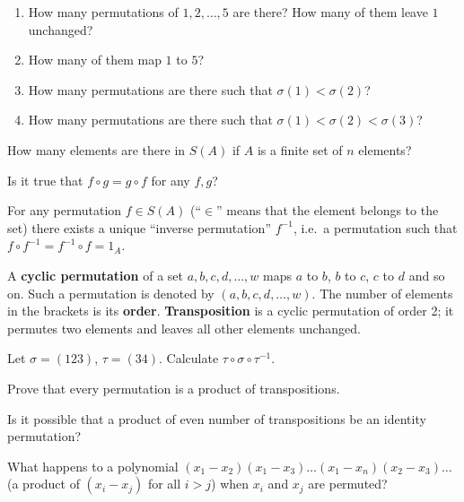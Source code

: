 \documentclass[12pt]{article}
\begin{document}
\begin{zadacha}
\begin{enumerate}
\item How many permutations of $1,2,\dots,5$ are there? How many of
  them leave $1$ unchanged?
\item How many of them map $1$ to $5$?
\item How many permutations are there such that $\sigma(1) <
  \sigma(2)$? 
\item How many permutations are there such that $\sigma(1) < \sigma(2)
  < \sigma(3)$?
\end{enumerate}
\end{zadacha}

\begin{zadacha} 
How many elements are there in $S(A)$  if $A$ is a finite set of $n$
elements?
\end{zadacha}

\begin{zadacha}  
Is it true that $f\circ g = g\circ f$ for any $f, g$?
\end{zadacha}

For any permutation $f\in S(A)$ (``$\in$'' means that the element
belongs to the set) there exists a unique ``inverse permutation''
$f^{-1}$, i.e.\ a permutation such that $f\circ f^{-1} = f^{-1}\circ f
= 1_A$.

A {\bf cyclic permutation} of a set $a,b,c,d, \dots, w$ maps $a$ to
$b$, $b$ to $c$, $c$ to $d$ and so on.  Such a permutation is denoted
by $(a,b,c,d,\dots,w)$.  The number of elements in the brackets is its
{ \bf order}. {\bf Transposition} is a cyclic permutation of order 2;
it permutes two elements and leaves all other elements unchanged.

\begin{zadacha}
Let $\sigma = (123)$, $\tau=(34)$. Calculate $\tau \circ \sigma \circ
\tau^{-1}$.
\end{zadacha}

\begin{zadacha}
Prove that every permutation is a product of transpositions.
\end{zadacha}

\begin{zadacha}[*] Is it possible that a product of even number of
  transpositions be an identity permutation?
\end{zadacha}

\begin{ukazanie} What happens to a polynomial 
$(x_1-x_2)(x_1-x_3)\dots(x_1-x_n)(x_2-x_3)\dots$ (a product of $(x_i -
x_j)$ for all $i > j$) when  $x_i$ and $x_j$ are permuted?
\end{ukazanie}
\end{document}
